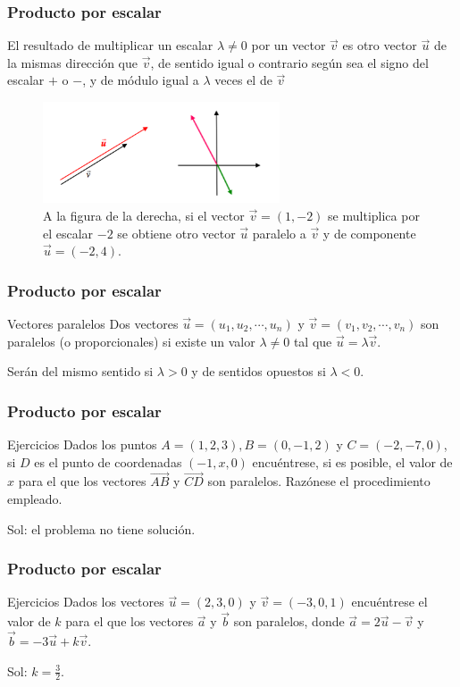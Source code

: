\documentclass{beamer}
\begin{document}
\begin{frame}
  \frametitle{Producto por escalar}
 
El resultado de multiplicar un escalar $\lambda\neq 0 $ por un vector $\vec{v}$ es otro vector $\vec{u}$ de la mismas direcci\'on que $\vec{v}$, de sentido igual o contrario seg\'un sea el signo del escalar $+$ o $-$, y de m\'odulo igual a $\lambda$ veces el de $\vec{v}$
\begin{figure}[h]
    \label{fig:producto por escalar}
\centering
\includegraphics[height = 3cm]{pte_escalar}
\caption{A la figura de la derecha, si el vector $\vec{v}=(1,-2)$ se multiplica por el escalar $-2$ se obtiene otro vector $\vec{u}$ paralelo a $\vec{v}$ y de componente $\vec{u} = (-2,4)$.}
\end{figure}

\end{frame}


\begin{frame}
  \frametitle{Producto por escalar}
  
  \begin{block}{Vectores paralelos}
Dos vectores $\vec{u} =(u_1,u_2,\cdots,u_n)$ y $\vec{v}=(v_1,v_2,\cdots,v_n)$ son paralelos (o proporcionales) si existe un valor $\lambda\neq 0$ tal que $\vec{u} = \lambda \vec{v}$. \end{block}
Ser\'an del mismo sentido si $\lambda>0$ y de sentidos opuestos si $\lambda<0$.

\end{frame}


\begin{frame}
  \frametitle{Producto por escalar}
  
  \begin{block}{Ejercicios}
Dados los puntos $A=(1,2,3), B=(0,-1,2)$ y $C=(-2,-7,0)$, si $D$ es el punto de coordenadas $(-1,x,0)$ encu\'entrese, si es posible, el valor de $x$ para el que los vectores $\vec{AB}$ y $\vec{CD}$ son paralelos. Raz\'onese el procedimiento empleado.
\end{block}
Sol: el problema no tiene soluci\'on.
\end{frame}


\begin{frame}
  \frametitle{Producto por escalar}
  
  \begin{block}{Ejercicios}
Dados los vectores $\vec{u}=(2,3,0)$ y $\vec{v}=(-3,0,1)$ encu\'entrese el valor de $k$ para el que los vectores $\vec{a}$ y $\vec{b}$ son paralelos, donde $\vec{a} = 2\vec{u}-\vec{v}$ y $\vec{b} = -3\vec{u}+k\vec{v}$.
\end{block}
Sol: $k = \frac{3}{2}$.
\end{frame}
\end{document}

